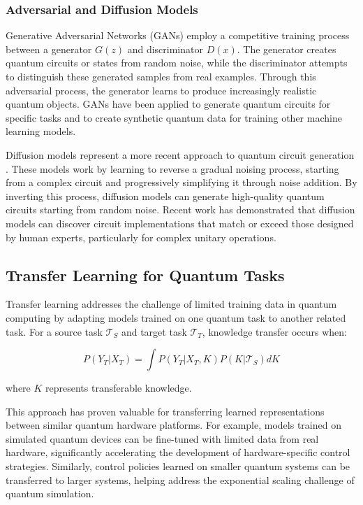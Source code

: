 \subsubsection{Adversarial and Diffusion Models}

Generative Adversarial Networks (GANs) employ a competitive training process between a generator $G(z)$ and discriminator $D(x)$. The generator creates quantum circuits or states from random noise, while the discriminator attempts to distinguish these generated samples from real examples. Through this adversarial process, the generator learns to produce increasingly realistic quantum objects. GANs have been applied to generate quantum circuits for specific tasks and to create synthetic quantum data for training other machine learning models.

Diffusion models represent a more recent approach to quantum circuit generation \cite{furrutter2024quantum}. These models work by learning to reverse a gradual noising process, starting from a complex circuit and progressively simplifying it through noise addition. By inverting this process, diffusion models can generate high-quality quantum circuits starting from random noise. Recent work has demonstrated that diffusion models can discover circuit implementations that match or exceed those designed by human experts, particularly for complex unitary operations.

\subsection{Transfer Learning for Quantum Tasks}

Transfer learning addresses the challenge of limited training data in quantum computing by adapting models trained on one quantum task to another related task. For a source task $\mathcal{T}_S$ and target task $\mathcal{T}_T$, knowledge transfer occurs when:

\begin{equation}
P(Y_T | X_T) = \int P(Y_T | X_T, K) P(K | \mathcal{T}_S) dK
\end{equation}

where $K$ represents transferable knowledge.

This approach has proven valuable for transferring learned representations between similar quantum hardware platforms. For example, models trained on simulated quantum devices can be fine-tuned with limited data from real hardware, significantly accelerating the development of hardware-specific control strategies. Similarly, control policies learned on smaller quantum systems can be transferred to larger systems, helping address the exponential scaling challenge of quantum simulation.

